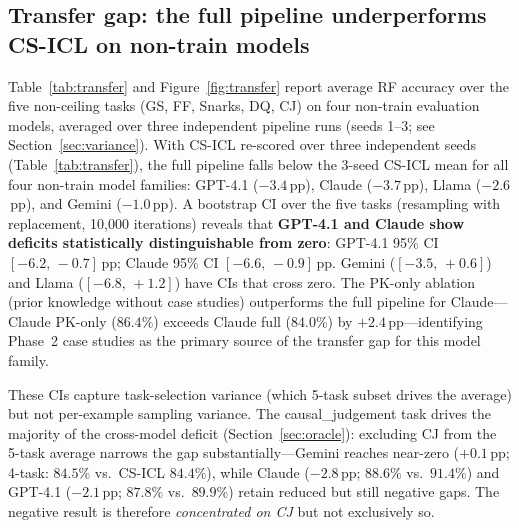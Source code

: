 \documentclass{article}
\begin{document}
\subsection{Transfer gap: the full pipeline underperforms CS-ICL on non-train models}
\label{sec:transfer}

Table~\ref{tab:transfer} and Figure~\ref{fig:transfer} report average RF accuracy over the
five non-ceiling tasks (GS, FF, Snarks, DQ, CJ) on four non-train evaluation models,
averaged over three independent pipeline runs (seeds 1--3; see Section~\ref{sec:variance}).
With CS-ICL re-scored over three independent seeds (Table~\ref{tab:transfer}), the full
pipeline falls below the 3-seed CS-ICL mean for all four non-train model families:
GPT-4.1 ($-3.4$\,pp), Claude ($-3.7$\,pp), Llama ($-2.6$\,pp), and Gemini ($-1.0$\,pp).
A bootstrap CI over the five tasks (resampling with replacement, 10{,}000 iterations) reveals
that \textbf{GPT-4.1 and Claude show deficits statistically distinguishable from zero}:
GPT-4.1 95\% CI $[-6.2,\,-0.7]$\,pp; Claude 95\% CI $[-6.6,\,-0.9]$\,pp.
Gemini ($[-3.5,\,+0.6]$) and Llama ($[-6.8,\,+1.2]$) have CIs that cross zero.
The PK-only ablation (prior knowledge without case studies) outperforms the full
pipeline for Claude---Claude PK-only ($86.4\%$) exceeds Claude full ($84.0\%$) by
$+2.4$\,pp---identifying Phase~2 case studies as the primary source of the transfer gap for
this model family.

These CIs capture task-selection variance (which 5-task subset drives the average) but not
per-example sampling variance.
The causal\_judgement task drives the majority of the cross-model deficit
(Section~\ref{sec:oracle}): excluding CJ from the 5-task average narrows the gap
substantially---Gemini reaches near-zero ($+0.1$\,pp; 4-task: $84.5\%$ vs.\ CS-ICL $84.4\%$),
while Claude ($-2.8$\,pp; $88.6\%$ vs.\ $91.4\%$) and GPT-4.1 ($-2.1$\,pp; $87.8\%$ vs.\ $89.9\%$)
retain reduced but still negative gaps.
The negative result is therefore \emph{concentrated on CJ} but not exclusively so.
\end{document}
